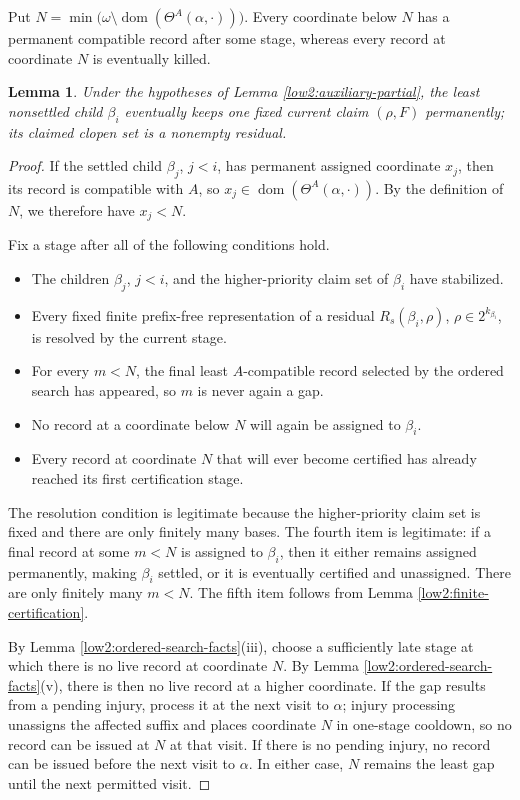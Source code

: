 \documentclass[11pt]{amsart}
\newtheorem{lemma}[theorem]{Lemma}
\begin{document}
Put
$N=\min\bigl(\omega\setminus
           \operatorname{dom}(\Theta^A(\alpha,\cdot))\bigr)$.
Every coordinate below $N$ has a permanent compatible record after some
stage, whereas every record at coordinate $N$ is eventually killed.

\begin{lemma}\label{low2:permanent-residual}
Under the hypotheses of Lemma \ref{low2:auxiliary-partial}, the least
nonsettled child $\beta_i$ eventually keeps one fixed current claim
$(\rho,F)$ permanently; its claimed clopen set is a nonempty residual.
\end{lemma}

\begin{proof}
If the settled child $\beta_j$, $j<i$, has permanent assigned coordinate
$x_j$, then its record is compatible with $A$, so
$x_j\in\operatorname{dom}(\Theta^A(\alpha,\cdot))$. By the definition of
$N$, we therefore have $x_j<N$.

Fix a stage after all of the following conditions hold.
\begin{itemize}
\item The children $\beta_j$, $j<i$, and the higher-priority claim set of
      $\beta_i$ have stabilized.
\item Every fixed finite prefix-free representation of a residual
      $R_s(\beta_i,\rho)$, $\rho\in2^{k_{\beta_i}}$, is resolved by the
      current stage.
\item For every $m<N$, the final least $A$-compatible record selected by the
      ordered search has appeared, so $m$ is never again a gap.
\item No record at a coordinate below $N$ will again be assigned to
      $\beta_i$.
\item Every record at coordinate $N$ that will ever become certified has
      already reached its first certification stage.
\end{itemize}
The resolution condition is legitimate because the higher-priority claim
set is fixed and there are only finitely many bases. The fourth item is
legitimate: if a final record at some $m<N$ is assigned to
$\beta_i$, then it either remains assigned permanently, making $\beta_i$
settled, or it is eventually certified and unassigned. There are only
finitely many $m<N$. The fifth item follows from Lemma
\ref{low2:finite-certification}.

By Lemma \ref{low2:ordered-search-facts}(iii), choose a sufficiently late
stage at which there is no live record at coordinate $N$. By Lemma
\ref{low2:ordered-search-facts}(v), there is then no live record at a higher
coordinate. If the gap results from a pending injury, process it at the next
visit to $\alpha$; injury processing unassigns the affected suffix and places
coordinate $N$ in one-stage cooldown, so no record can be issued at $N$ at
that visit. If there is no pending injury, no record can be issued before the
next visit to $\alpha$. In either case, $N$ remains the least gap until the
next permitted visit.


\end{proof}
\end{document}
